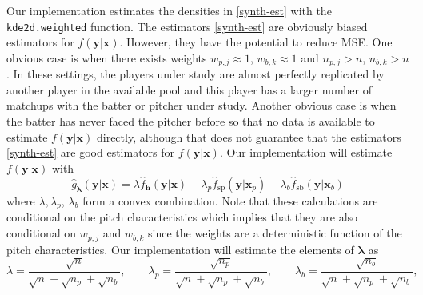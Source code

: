 \documentclass[11pt]{article}
\newcommand{\y}{\textbf{y}}
\newcommand{\x}{\textbf{x}}
\newcommand{\h}{\textbf{h}}
\newcommand{\wstar}{w^{\textstyle{*}}}
\newcommand{\lambdabf}{\boldsymbol{\lambda}}
\begin{document}

Our implementation estimates the densities in \eqref{synth-est} with the \texttt{kde2d.weighted} function. The estimators \eqref{synth-est} are obviously biased estimators for $f(\y|\x)$. However, they have the potential to reduce MSE. One obvious case is when there exists weights $w_{p,j} \approx 1$, $w_{b,k} \approx 1$  and $n_{p,j} > n$, $n_{b,k} > n$. In these settings, the players under study are almost perfectly replicated by another player in the available pool and this player has a larger number of matchups with the batter or pitcher under study. Another obvious case is when the batter has never faced the pitcher before so that no data is available to estimate $f(\y|\x)$ directly, although that does not guarantee that the estimators \eqref{synth-est} are good estimators for $f(\y|\x)$. Our implementation will estimate $f(\y|\x)$ with
\begin{equation} \label{sd-implem}
  \hat{g}_{\lambdabf}(\y|\x) = \lambda \hat f_\h(\y|\x) 
    + \lambda_p \hat f_{\text{sp}}(\y|\x_p) 
    + \lambda_b \hat f_{\text{sb}}(\y|\x_b)
\end{equation}
where $\lambda,\lambda_p$, $\lambda_b$ form a convex combination. %
Note that these calculations are conditional on the pitch characteristics which implies that they are also conditional on $w_{p,j}$ and $w_{b,k}$ since the weights are a deterministic function of the pitch characteristics. Our implementation will estimate the elements of $\lambdabf$ as 
$$
  \lambda = \frac{\sqrt{n}}{\sqrt{n} + \sqrt{n_p} + \sqrt{n_b}}, \qquad
  \lambda_p = \frac{\sqrt{n_p}}{\sqrt{n} + \sqrt{n_p} + \sqrt{n_b}}, \qquad
  \lambda_b = \frac{\sqrt{n_b}}{\sqrt{n} + \sqrt{n_p} + \sqrt{n_b}},
$$
\end{document}

